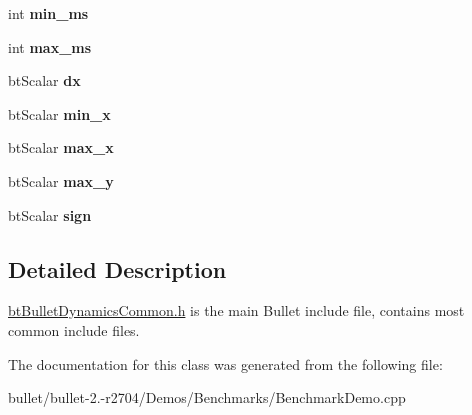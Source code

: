 \begin{DoxyCompactItemize}
\item 
\hypertarget{classbt_raycast_bar2_ad44226e0b3008ad8b4143abc9377a963}{int {\bfseries min\+\_\+ms}}\label{classbt_raycast_bar2_ad44226e0b3008ad8b4143abc9377a963}

\item 
\hypertarget{classbt_raycast_bar2_a87ea6df0bfc9900072b2f622e6241e83}{int {\bfseries max\+\_\+ms}}\label{classbt_raycast_bar2_a87ea6df0bfc9900072b2f622e6241e83}

\item 
\hypertarget{classbt_raycast_bar2_aabd079dd95cede30d0e9200f904554d4}{bt\+Scalar {\bfseries dx}}\label{classbt_raycast_bar2_aabd079dd95cede30d0e9200f904554d4}

\item 
\hypertarget{classbt_raycast_bar2_ade197e7844ab9c7683891960628d89a2}{bt\+Scalar {\bfseries min\+\_\+x}}\label{classbt_raycast_bar2_ade197e7844ab9c7683891960628d89a2}

\item 
\hypertarget{classbt_raycast_bar2_a6a326d35d0f765ba42f3eb918f1bbf8c}{bt\+Scalar {\bfseries max\+\_\+x}}\label{classbt_raycast_bar2_a6a326d35d0f765ba42f3eb918f1bbf8c}

\item 
\hypertarget{classbt_raycast_bar2_a55f56f5c05ec312e0502a22e77277b73}{bt\+Scalar {\bfseries max\+\_\+y}}\label{classbt_raycast_bar2_a55f56f5c05ec312e0502a22e77277b73}

\item 
\hypertarget{classbt_raycast_bar2_a35bf29a28073d85d3ac0aca675a9da52}{bt\+Scalar {\bfseries sign}}\label{classbt_raycast_bar2_a35bf29a28073d85d3ac0aca675a9da52}

\end{DoxyCompactItemize}


\subsection{Detailed Description}
\hyperlink{bt_bullet_dynamics_common_8h_source}{bt\+Bullet\+Dynamics\+Common.\+h} is the main Bullet include file, contains most common include files. 

The documentation for this class was generated from the following file\+:\begin{DoxyCompactItemize}
\item 
bullet/bullet-\/2.-\/r2704/\+Demos/\+Benchmarks/Benchmark\+Demo.\+cpp\end{DoxyCompactItemize}

